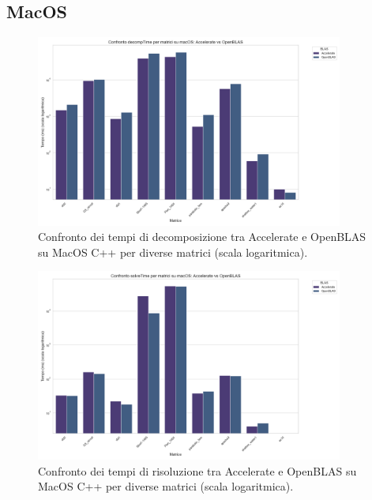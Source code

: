 \subsection{MacOS}

\begin{figure}[H]
    \centering
    \includegraphics[width=0.9\textwidth]{images/C++/macOs/decompTime_comparison}
    \caption{Confronto dei tempi di decomposizione tra Accelerate e OpenBLAS su MacOS C++ per diverse matrici (scala logaritmica).}
    \label{fig:macos-decomp-comparison}
\end{figure}

\begin{figure}[H]
    \centering
    \includegraphics[width=0.9\textwidth]{images/C++/macOs/solveTime_comparison}
    \caption{Confronto dei tempi di risoluzione tra Accelerate e OpenBLAS su MacOS C++ per diverse matrici (scala logaritmica).}
    \label{fig:macos-solve-comparison}
\end{figure}

